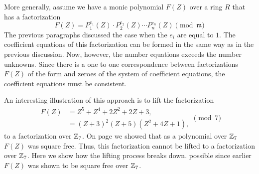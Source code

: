 \smallskip
More generally, assume we have a monic polynomial $F(Z)$ over a ring
$R$ that has a factorization
\begin{equation} \label{Hensel:NSQ:Eq}
F(Z) = P_1^{e_1}(Z) \cdot P_2^{e_2}(Z) \cdots P_n^{e_n}(Z)
\pmod{\mathfrak{m}}
\end{equation}
The previous paragraphs discussed the case when the $e_i$ are equal to
$1$.  The coefficient equations of this factorization can be formed in
the same way as in the previous discussion.  Now, however, the number
equations exceeds the number unknowns.  Since there is a one to one
correspondence between factorizations $F(Z)$ of the form
 and zeroes of the system of coefficient
equations, the coefficient equations must be consistent.

An interesting illustration of this approach is to lift the
factorization 
\[
\begin{aligned}
F(Z) & = Z^5 + Z^4 + 2Z^2 + 2Z + 3, \\
  & = (Z+3)^2 (Z+5) (Z^2 + 4Z+1),
\end{aligned}
\pmod{7}
\]
to a factorization over $\mathbb{Z}_7$.  On page \pageref{PolyZ7:SQFR:Ex} we showed that as
a polynomial over $\mathbb{Z}_7$ $F(Z)$ was square free.  Thus, this
factorization cannot be lifted to a factorization over $\mathbb{Z}_7$. Here we
show how the lifting process breaks down. possible since earlier $F(Z)$ was shown to be square free over $\mathbb{Z}_7$.

